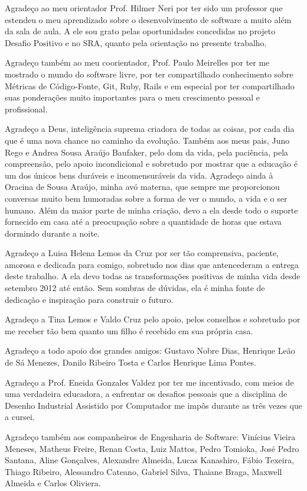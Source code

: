 \begin{agradecimentos}
Agradeço ao meu orientador Prof. Hilmer Neri por ter sido um professor que estendeu o meu aprendizado sobre o desenvolvimento de software a muito além da sala de aula. A ele sou grato pelas oportunidades concedidas no projeto Desafio Positivo e no SRA, quanto pela orientação no presente trabalho. 

Agradeço também ao meu coorientador, Prof. Paulo Meirelles por ter me mostrado o mundo do software livre, por ter compartilhado conhecimento sobre Métricas de Código-Fonte, Git, Ruby, Rails e em especial por ter compartilhado suas ponderações muito importantes para o meu crescimento pessoal e profissional.

Agradeço a Deus, inteligência suprema criadora de todas as coisas, por cada dia que é uma nova chance no caminho da evolução. Também aos meus pais, Juno Rego e Andrea Sousa Araújo Baufaker, pelo dom da vida, pela paciência, pela compreensão, pelo apoio incondicional e sobretudo por mostrar que a educação é um dos únicos bens duráveis e incomensuráveis da vida. Agradeço ainda à Oracina de Sousa Araújo, minha avó materna, que sempre me proporcionou conversas muito bem humoradas sobre a forma de ver o mundo, a vida e o ser humano. Além da maior parte de minha criação, devo a ela desde todo o suporte fornecido em casa até a preocupação sobre a quantidade de horas que estava dormindo durante a noite.

Agradeço a Luisa Helena Lemos da Cruz por ser tão comprensiva, paciente, amorosa e dedicada para comigo, sobretudo nos dias que antencederam a entrega deste trabalho. A ela devo todas as transformações positivas de minha vida desde setembro 2012 até então. Sem sombras de dúvidas, ela é minha fonte de dedicação e inspiração para construir o futuro. 

Agradeço a Tina Lemos e Valdo Cruz pelo apoio, pelos conselhos e sobretudo por me receber tão bem quanto um filho é recebido em sua própria casa.

Agradeço a todo apoio dos grandes amigos: Gustavo Nobre Dias, Henrique Leão de Sá Menezes, Danilo Ribeiro Tosta e Carlos Henrique Lima Pontes.


Agradeço a Prof. Eneida Gonzales Valdez por ter me incentivado, com meios de uma verdadeira educadora, a enfrentar os desafios pessoais que a disciplina de Desenho Industrial Assistido por Computador me impôs durante as três vezes que a cursei.

Agradeço também aos companheiros de Engenharia de Software: Vinícius Vieira Meneses, Matheus Freire, Renan Costa, Luiz Mattos, Pedro Tomioka, José Pedro Santana, Aline Gonçalves, Alexandre Almeida, Lucas Kanashiro, Fábio Texeira, Thiago Ribeiro, Alessandro Cateano, Gabriel Silva, Thaiane Braga, Maxwell Almeida e Carlos Oliviera. 

\end{agradecimentos}
